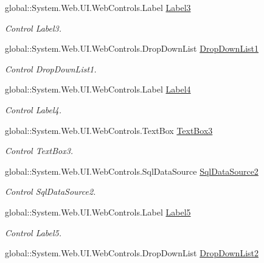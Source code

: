 \begin{DoxyCompactItemize}
global\+::\+System.\+Web.\+U\+I.\+Web\+Controls.\+Label \mbox{\hyperlink{classInicio_1_1Profesor_1_1InsertarTarea_abc61993bb5b9cc2aaab49fcc573937f8}{Label3}}
\begin{DoxyCompactList}\small\item\em Control Label3. \end{DoxyCompactList}\item 
global\+::\+System.\+Web.\+U\+I.\+Web\+Controls.\+Drop\+Down\+List \mbox{\hyperlink{classInicio_1_1Profesor_1_1InsertarTarea_a48d596bdb2209597a6836d27775493e9}{Drop\+Down\+List1}}
\begin{DoxyCompactList}\small\item\em Control Drop\+Down\+List1. \end{DoxyCompactList}\item 
global\+::\+System.\+Web.\+U\+I.\+Web\+Controls.\+Label \mbox{\hyperlink{classInicio_1_1Profesor_1_1InsertarTarea_a972ff301ea677f3e47a024a02569c58a}{Label4}}
\begin{DoxyCompactList}\small\item\em Control Label4. \end{DoxyCompactList}\item 
global\+::\+System.\+Web.\+U\+I.\+Web\+Controls.\+Text\+Box \mbox{\hyperlink{classInicio_1_1Profesor_1_1InsertarTarea_ac391e2a8a6bed6d1092a989c712391a2}{Text\+Box3}}
\begin{DoxyCompactList}\small\item\em Control Text\+Box3. \end{DoxyCompactList}\item 
global\+::\+System.\+Web.\+U\+I.\+Web\+Controls.\+Sql\+Data\+Source \mbox{\hyperlink{classInicio_1_1Profesor_1_1InsertarTarea_aeff362eb964881337a984bbfc4b9aba9}{Sql\+Data\+Source2}}
\begin{DoxyCompactList}\small\item\em Control Sql\+Data\+Source2. \end{DoxyCompactList}\item 
global\+::\+System.\+Web.\+U\+I.\+Web\+Controls.\+Label \mbox{\hyperlink{classInicio_1_1Profesor_1_1InsertarTarea_af5b66456b170efa53193afd4c2694e53}{Label5}}
\begin{DoxyCompactList}\small\item\em Control Label5. \end{DoxyCompactList}\item 
global\+::\+System.\+Web.\+U\+I.\+Web\+Controls.\+Drop\+Down\+List \mbox{\hyperlink{classInicio_1_1Profesor_1_1InsertarTarea_a3a157cb6f654a20976e2c247e3e6a26a}{Drop\+Down\+List2}}

\end{DoxyCompactItemize}
